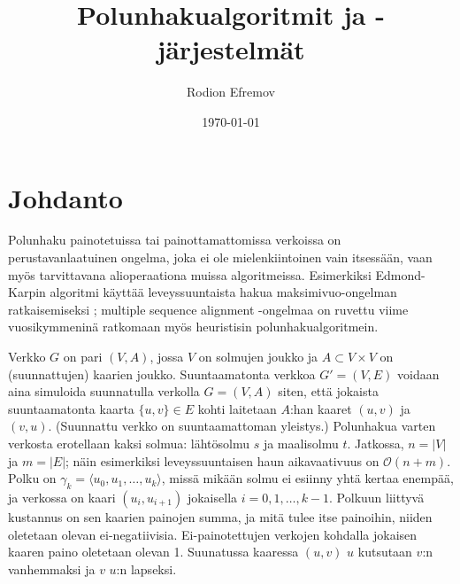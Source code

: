 \documentclass[finnish]{tktltiki2}
\title{Polunhakualgoritmit ja -järjestelmät}
\author{Rodion Efremov}
\date{\today}
\theoremstyle{definition}
\theoremstyle{remark}
\begin{document}

\frontmatter      %

\maketitle        %
\makeabstract     %

\tableofcontents  %


\mainmatter       %

\section{Johdanto}
Polunhaku painotetuissa tai painottamattomissa verkoissa on perustavanlaatuinen ongelma, joka ei ole mielenkiintoinen vain itsessään, vaan myös tarvittavana alioperaationa muissa algoritmeissa. Esimerkiksi Edmond-Karpin algoritmi käyttää leveyssuuntaista hakua maksimivuo-ongelman ratkaisemiseksi \cite{Cormen09}; multiple sequence alignment -ongelmaa on ruvettu viime vuosikymmeninä ratkomaan myös heuristisin polunhakualgoritmein.

Verkko $G$ on pari $(V, A)$, jossa $V$ on solmujen joukko ja $A \subset V \times V$ on (suunnattujen) kaarien joukko. Suuntaamatonta verkkoa $G' = (V, E)$ voidaan aina simuloida suunnatulla verkolla $G= (V, A)$ siten, että jokaista suuntaamatonta kaarta $\{ u, v \} \in E$ kohti laitetaan $A$:han kaaret $(u, v)$ ja $(v, u)$. (Suunnattu verkko on suuntaamattoman yleistys.) Polunhakua varten verkosta erotellaan kaksi solmua: lähtösolmu $s$ ja maalisolmu $t$. Jatkossa, $n = |V|$ ja $m = |E|$; näin esimerkiksi leveyssuuntaisen haun aikavaativuus on $\mathcal{O}(n + m)$. Polku on $\gamma_k = \langle u_0, u_1, \dots, u_k \rangle$, missä mikään solmu ei esiinny yhtä kertaa enempää, ja verkossa on kaari $(u_i, u_{i + 1})$ jokaisella $i = 0, 1, \dots, k - 1$. Polkuun liittyvä kustannus on sen kaarien painojen summa, ja mitä tulee itse painoihin, niiden oletetaan olevan ei-negatiivisia. Ei-painotettujen verkojen kohdalla jokaisen kaaren paino oletetaan olevan 1. Suunatussa kaaressa $(u, v)$ $u$ kutsutaan $v$:n vanhemmaksi ja $v$ $u$:n lapseksi.

%
%
% 
%
\end{document}
